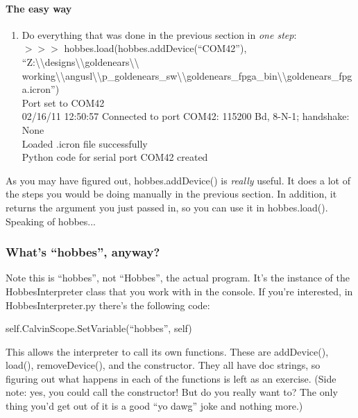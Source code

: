 %
%
\paragraph{The easy way}
\label{3.2.1.1}

\begin{enumerate}
\item Do everything that was done in the previous section in \emph{one step}:\\
$>>>$ hobbes.load(hobbes.addDevice(``COM42''), ``Z:\textbackslash \textbackslash designs\textbackslash \textbackslash goldenears\textbackslash \textbackslash \\
working\textbackslash \textbackslash angusl\textbackslash \textbackslash p\_goldenears\_sw\textbackslash \textbackslash goldenears\_fpga\_bin\textbackslash \textbackslash goldenears\_fpga.icron'')\\
Port set to COM42\\
02/16/11 12:50:57 Connected to port COM42: 115200 Bd, 8-N-1; handshake: None\\
Loaded .icron file successfully\\
Python code for serial port COM42 created
\end{enumerate}

As you may have figured out, hobbes.addDevice() is \emph{really} useful. It does a lot of the steps you would be doing manually in the previous section. In addition, it returns the argument you just passed in, so you can use it in hobbes.load(). Speaking of hobbes...



%
%
\subsubsection{What's ``hobbes'', anyway?}
\label{3.2.2}

Note this is ``hobbes'', not ``Hobbes'', the actual program. It's the instance of the HobbesInterpreter class that you work with in the console. If you're interested, in HobbesInterpreter.py there's the following code:

\vspace{12pt}
\noindent self.CalvinScope.SetVariable(``hobbes'', self)
\vspace{12pt}

This allows the interpreter to call its own functions. These are addDevice(), load(), removeDevice(), and the constructor. They all have doc strings, so figuring out what happens in each of the functions is left as an exercise. (Side note: yes, you could call the constructor! But do you really want to? The only thing you'd get out of it is a good ``yo dawg'' joke and nothing more.)

